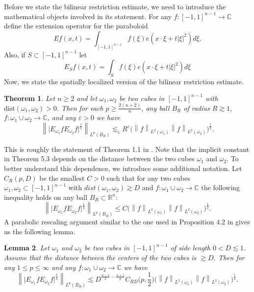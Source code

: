 \documentclass[11pt]{amsart}
\numberwithin{equation}{section}
\newcommand{\C}{\mathbb{C}}
\newcommand\norm[1]{\left\lVert#1\right\rVert}
\newcommand{\lpnorm}[3]{\norm{#1}_{L^{#2}(#3)}}
\newtheorem{theorem}{Theorem}[section]
\newtheorem{lemma}[theorem]{Lemma}
\begin{document}
Before we state the bilinear restriction estimate, we need to introduce the mathematical objects involved in its statement. For any $f:[-1,1]^{n-1} \to \C$ define the extension operator for the paraboloid
\begin{equation}
    Ef(x,t) = \int_{[-1,1]^{n-1}} f(\xi)e(x\cdot \xi + t|\xi|^2)d\xi.
\end{equation}
Also, if $S \subset [-1,1]^{n-1}$ let 
\begin{equation}
    E_{S}f(x,t) = \int_{S} f(\xi)e(x\cdot \xi + t|\xi|^2)d\xi
\end{equation}
Now, we state the spatially localized version of the bilinear restriction estimate.
\begin{theorem}
    Let $n \geq 2$ and let $\omega_1, \omega_2$ be two cubes in $[-1,1]^{n-1}$ with $\text{dist}(\omega_1, \omega_2) > 0$. Then for each $p \geq \frac{2(n+2)}{n}$, any ball $B_R$ of radius $R \gtrsim 1$, $f:\omega_1 \cup \omega_2 \to \C$, and any $\varepsilon > 0$ we have
    \begin{equation} \label{bilinear restriction orginal}
        \lpnorm{\big|E_{\omega_1}f E_{\omega_2}f\big|^{\frac{1}{2}}}{p}{B_R} \lesssim_{\varepsilon} R^{\varepsilon}\Big( \lpnorm{f}{2}{\omega_1} \lpnorm{f}{2}{\omega_2}\Big)^{\frac{1}{2}}.
    \end{equation}
\end{theorem}
\noindent This is roughly the statement of Theorem 1.1 in \cite{taobilinear}. Note that the implicit constant in Theorem 5.3 depends on the distance between the two cubes $\omega_1$ and $\omega_2$. To better understand this dependence, we introduce some additional notation. Let $C_{R}(p, D)$ be the smallest $C > 0$ such that for any two cubes $\omega_1, \omega_2 \subset [-1,1]^{n-1}$ with $dist(\omega_1, \omega_2) \gtrsim D$ and $f: \omega_1 \cup \omega_2 \to \C$ the following inequality holds on any ball $B_R \subset \mathbb{R}^n$:
\begin{equation}
     \lpnorm{\big|E_{\omega_1}f E_{\omega_2}f\big|^{\frac{1}{2}}}{p}{B_R} \leq C\Big( \lpnorm{f}{2}{\omega_1} \lpnorm{f}{2}{\omega_2}\Big)^{\frac{1}{2}}.
\end{equation}
A parabolic rescaling argument similar to the one used in Proposition 4.2 in \cite{demeter2020fourier} gives us the following lemma.
\begin{lemma}
    Let $\omega_1$ and $\omega_2$ be two cubes in $[-1,1]^{n-1}$ of side length $ 0 < D \lesssim 1$. Assume that the distance between the centers of the two cubes is $\gtrsim D$. Then for any $1 \leq p \leq \infty$ and any $f: \omega_1 \cup \omega_2 \to \mathbb{C}$ we have
    \begin{equation}
        \lpnorm{\big|E_{\omega_1}f E_{\omega_2}f\big|^{\frac{1}{2}}}{p}{B_R} \lesssim D^{\frac{n-1}{2} - \frac{n+1}{p}} C_{RD}\Big(p, \frac{1}{2}\Big)\Big(\lpnorm{f}{2}{\omega_1} \lpnorm{f}{2}{\omega_2}\Big)^\frac{1}{2}.
    \end{equation}
\end{lemma}
\end{document}
